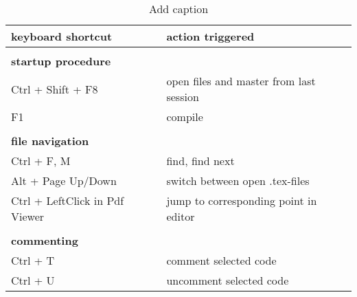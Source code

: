 \begin{table}[htbp]
  \centering


    \begin{tabular}{ll}
    \toprule
    keyboard shortcut & action triggered \\
    \midrule
    \multicolumn{1}{r}{} & \multicolumn{1}{r}{} \\
    \multicolumn{2}{l}{\textbf{startup procedure}} \\
    Ctrl + Shift + F8 & open files and master from last session \\
    F1    & compile \\
          &  \\
    \multicolumn{2}{l}{\textbf{file navigation}} \\
    Ctrl + F, M & find, find next \\
    Alt + Page Up/Down & switch between open .tex-files \\
    Ctrl + LeftClick in Pdf Viewer & jump to corresponding point in editor \\
          &  \\
    \multicolumn{2}{l}{\textbf{commenting}} \\
    Ctrl + T & comment selected code \\
    Ctrl + U & uncomment selected code \\
    \bottomrule
    \end{tabular}%

	\caption{Add caption}
	\label{tab:keyboard-shorts}

\end{table}%

